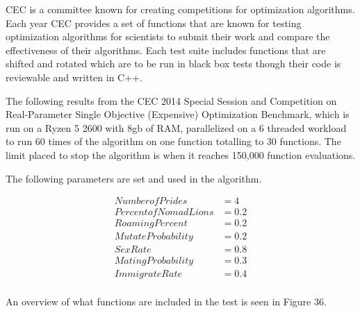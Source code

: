 CEC is a committee known for creating competitions for optimization algorithms. Each year CEC provides a set of functions that are known for testing optimization algorithms for scientists to submit their work and compare the effectiveness of their algorithms. Each test suite includes functions that are shifted and rotated which are to be run in black box tests though their code is reviewable and written in C++.

The following results from the CEC 2014 Special Session and Competition on Real-Parameter Single Objective (Expensive) Optimization Benchmark, which is run on a Ryzen 5 2600 with 8gb of RAM, parallelized on a 6 threaded workload to run 60 times of the algorithm on one function totalling to 30 functions. The limit placed to stop the algorithm is when it reaches 150,000 function evaluations.

The following parameters are set and used in the algorithm.

\begin{align}
Number of Prides &= 4\\
Percent of Nomad Lions &= 0.2\\
Roaming Percent &= 0.2\\
Mutate Probability &= 0.2\\
Sex Rate &= 0.8\\
Mating Probability &= 0.3\\
Immigrate Rate &= 0.4\\
\end{align}

An overview of what functions are included in the test is seen in Figure 36.

